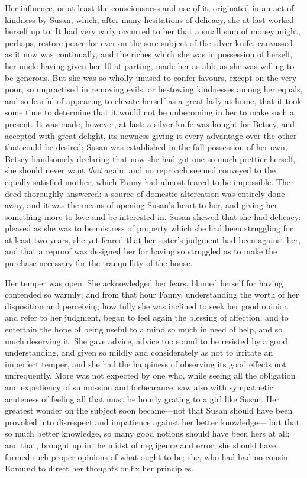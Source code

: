 Her influence, or at least the consciousness and use of it,
originated in an act of kindness by Susan, which, after many
hesitations of delicacy, she at last worked herself up to.
It had very early occurred to her that a small sum
of money might, perhaps, restore peace for ever on the
sore subject of the silver knife, canvassed as it now
was continually, and the riches which she was in possession
of herself, her uncle having given her 10 at parting,
made her as able as she was willing to be generous.
But she was so wholly unused to confer favours,
except on the very poor, so unpractised in removing evils,
or bestowing kindnesses among her equals, and so fearful
of appearing to elevate herself as a great lady at home,
that it took some time to determine that it would not be
unbecoming in her to make such a present.  It was made,
however, at last:  a silver knife was bought for Betsey,
and accepted with great delight, its newness giving it
every advantage over the other that could be desired;
Susan was established in the full possession of her own,
Betsey handsomely declaring that now she had got one so much
prettier herself, she should never want \emph{that} again; and no
reproach seemed conveyed to the equally satisfied mother,
which Fanny had almost feared to be impossible.  The deed
thoroughly answered:  a source of domestic altercation
was entirely done away, and it was the means of opening
Susan's heart to her, and giving her something more to love
and be interested in.  Susan shewed that she had delicacy:
pleased as she was to be mistress of property which she
had been struggling for at least two years, she yet
feared that her sister's judgment had been against her,
and that a reproof was designed her for having so struggled
as to make the purchase necessary for the tranquillity of
the house.

Her temper was open.  She acknowledged her fears,
blamed herself for having contended so warmly;
and from that hour Fanny, understanding the worth of her
disposition and perceiving how fully she was inclined
to seek her good opinion and refer to her judgment,
began to feel again the blessing of affection, and to
entertain the hope of being useful to a mind so much in
need of help, and so much deserving it.  She gave advice,
advice too sound to be resisted by a good understanding,
and given so mildly and considerately as not to irritate
an imperfect temper, and she had the happiness of observing
its good effects not unfrequently.  More was not expected
by one who, while seeing all the obligation and expediency
of submission and forbearance, saw also with sympathetic
acuteness of feeling all that must be hourly grating
to a girl like Susan.  Her greatest wonder on the subject
soon became---not that Susan should have been provoked into
disrespect and impatience against her better knowledge---%
but that so much better knowledge, so many good notions
should have been hers at all; and that, brought up in the
midst of negligence and error, she should have formed
such proper opinions of what ought to be; she, who had
had no cousin Edmund to direct her thoughts or fix her principles.

